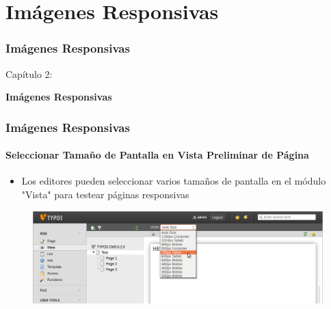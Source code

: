 %

\section{Imágenes Responsivas}
\begin{frame}[fragile]
	\frametitle{Imágenes Responsivas}

	\begin{center}\huge{Capítulo 2:}\end{center}
	\begin{center}\huge{\color{typo3darkgrey}\textbf{Imágenes Responsivas}}\end{center}

\end{frame}


\begin{frame}[fragile]
	\frametitle{Imágenes Responsivas}
	\framesubtitle{Seleccionar Tamaño de Pantalla en Vista Preliminar de Página}

	\begin{itemize}
		\item Los editores pueden seleccionar varios tamaños de pantalla en el módulo "Vista" para testear páginas responsivas
	\end{itemize}

	\begin{figure}
		\includegraphics[width=0.95\linewidth]{Images/ResponsiveImages/ScreenSizeInPagePreview.png}
	\end{figure}

\end{frame}

